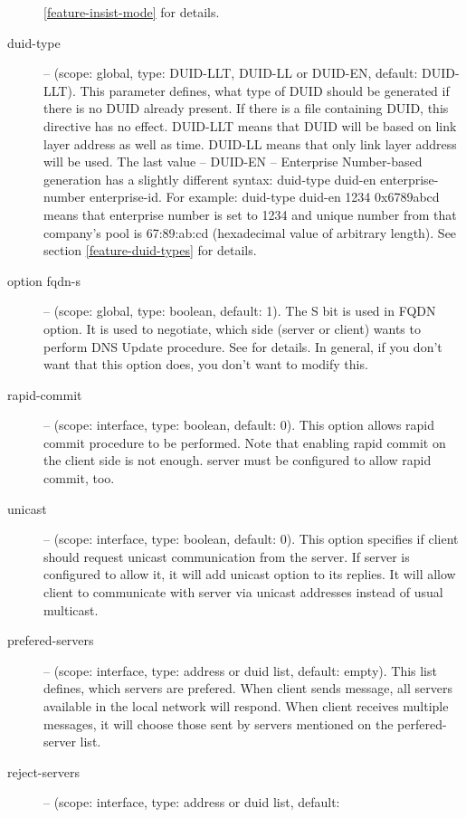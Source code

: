 \begin{description}
            \ref{feature-insist-mode} for details.
 \item[duid-type] -- (scope: global, type: DUID-LLT, DUID-LL or DUID-EN,
	    default: DUID-LLT). This parameter defines, what type of
	    DUID should be generated if there is no DUID already
	    present. If there is a file containing DUID, this directive
	    has no effect. DUID-LLT means that DUID will be based on
	    link layer address as well as time. DUID-LL means that only
	    link layer address will be used. The last value -- DUID-EN
	    -- Enterprise Number-based generation has a slightly
            different syntax: duid-type duid-en enterprise-number
            enterprise-id. For example: duid-type duid-en 1234 0x6789abcd
            means that enterprise number is set to 1234 and unique
            number from that company's pool is 67:89:ab:cd
            (hexadecimal value of arbitrary length). See section
            \ref{feature-duid-types} for details.
\item[option fqdn-s] -- (scope: global, type: boolean, default:
            1). The S bit is used in FQDN option. It is used to
            negotiate, which side (server or client) wants to perform
            DNS Update procedure. See \cite{rfc4704} for details. In
            general, if you don't want that this option does, you
            don't want to modify this.
 \item[rapid-commit] -- (scope: interface, type: boolean, default:
	    0). This option allows rapid commit procedure to be
	    performed. Note that enabling rapid commit on the client
	    side is not enough. server must be configured to allow
	    rapid commit, too.
 \item[unicast] -- (scope: interface, type: boolean, default: 0). This
	    option specifies if client should request unicast
	    communication from the server. If server is configured to
	    allow it, it will add unicast option to its replies. It will
	    allow client to communicate with server via unicast
	    addresses instead of usual multicast.
 \item[prefered-servers] -- (scope: interface, type: address or duid list, default:
	    empty). This list defines, which servers are prefered. When
	    client sends  message, all servers available in
	    the local network will respond. When client receives
	    multiple  messages, it will choose those sent
	    by servers mentioned on the perfered-server list.
 \item[reject-servers] -- (scope: interface, type: address or duid list, default:

\end{description}
